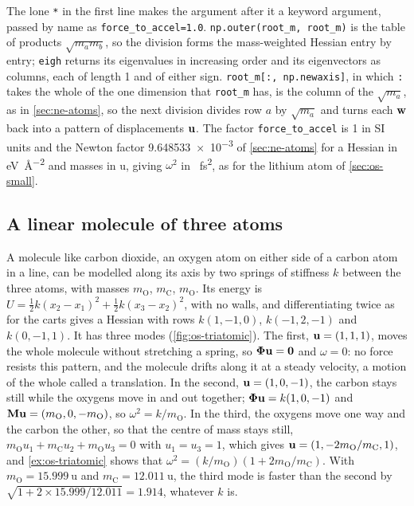 The lone \texttt{*} in the first line makes the argument after it a
keyword argument, passed by name as \texttt{force\_to\_accel=1.0}.
\texttt{np.outer(root\_m, root\_m)} is the table of products $\sqrt{m_a
m_b}$, so the division forms the mass-weighted Hessian entry by entry;
\texttt{eigh} returns its eigenvalues in increasing order and its
eigenvectors as columns, each of length 1 and of either sign.
\texttt{root\_m[:, np.newaxis]}, in which \texttt{:} takes the whole of
the one dimension that \texttt{root\_m} has, is the column of the
$\sqrt{m_a}$, as in \cref{sec:ne-atoms}, so the next division divides row
$a$ by $\sqrt{m_a}$ and turns each $\bm{\mathrm{w}}$ back into a pattern of
displacements $\bm{\mathrm{u}}$. The factor \texttt{force\_to\_accel} is 1 in SI
units and the Newton factor \num{9.648533e-3} of \cref{sec:ne-atoms} for a
Hessian in \si{\electronvolt\per\angstrom\squared} and masses in
\si{\amu}, giving $\omega^2$ in \si{\per\femto\second\squared}, as for
the lithium atom of \cref{sec:os-small}.

\subsection*{A linear molecule of three atoms}

A molecule like carbon dioxide, an oxygen atom on either side of a carbon
atom in a line, can be modelled along its axis by two springs of
stiffness $k$ between the three atoms, with masses $m_{\mathrm O}$,
$m_{\mathrm C}$, $m_{\mathrm O}$. Its energy is $U = \frac12 k(x_2 -
x_1)^2 + \frac12 k(x_3 - x_2)^2$, with no walls, and differentiating twice
as for the carts gives a Hessian with rows $k(1, -1, 0)$, $k(-1, 2, -1)$
and $k(0, -1, 1)$. It has three modes
(\cref{fig:os-triatomic}). The first, $\bm{\mathrm{u}} = (1, 1, 1)$, moves the whole
molecule without stretching a spring, so $\boldsymbol{\Phi}\bm{\mathrm{u}} =
\bm{\mathrm{0}}$ and $\omega = 0$: no force resists this pattern, and the molecule
drifts along it at a steady velocity, a motion of the whole called a
translation. In the second, $\bm{\mathrm{u}} = (1, 0, -1)$, the
carbon stays still while the oxygens move in and out together;
$\boldsymbol{\Phi}\bm{\mathrm{u}} = k(1, 0, -1)$ and $\bm{\mathrm{M}}\bm{\mathrm{u}} = (m_{\mathrm O}, 0,
-m_{\mathrm O})$, so $\omega^2 = k/m_{\mathrm O}$. In the third, the oxygens
move one way and the carbon the other, so that the centre of mass stays
still, $m_{\mathrm O}u_1 + m_{\mathrm C}u_2 + m_{\mathrm O}u_3 = 0$ with
$u_1 = u_3 = 1$, which gives $\bm{\mathrm{u}} = (1, -2m_{\mathrm O}/m_{\mathrm C},
1)$, and
\cref{ex:os-triatomic} shows that $\omega^2 = (k/m_{\mathrm O})(1 +
2m_{\mathrm O}/m_{\mathrm C})$. With $m_{\mathrm O} = \SI{15.999}{\amu}$ and
$m_{\mathrm C} = \SI{12.011}{\amu}$, the third mode is faster than the
second by $\sqrt{1 + 2\times15.999/12.011} = 1.914$, whatever $k$ is.

